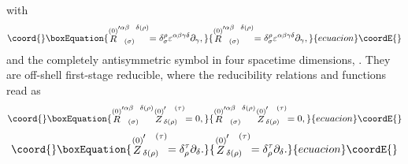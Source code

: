 \documentclass[a4paper,12pt]{article}
\begin{document}
with 
\begin{equation}\coord{}\boxEquation{
\stackrel{(0)}{R}_{\;\;\;(\sigma )}^{\prime \alpha \beta \;\;\;\delta (\rho
)}=\delta _{\sigma }^{\rho }\varepsilon ^{\alpha \beta \gamma \delta
}\partial _{\gamma },  \label{fcola4}
}{
\stackrel{(0)}{R}_{\;\;\;(\sigma )}^{\prime \alpha \beta \;\;\;\delta (\rho
)}=\delta _{\sigma }^{\rho }\varepsilon ^{\alpha \beta \gamma \delta
}\partial _{\gamma },  }{ecuacion}\coordE{}\end{equation}
and \myHighlight{$\varepsilon ^{\alpha \beta \gamma \delta }$}\coordHE{} the completely
antisymmetric symbol in four spacetime dimensions, \coordHE{}.
They are off-shell first-stage reducible, where the reducibility relations
and functions read as 
\begin{equation}\coord{}\boxEquation{
\stackrel{(0)}{R}_{\;\;\;(\sigma )}^{\prime \alpha \beta \;\;\;\delta (\rho
)}\stackrel{(0)}{Z}_{\delta (\rho )}^{\prime \;\;\;\;(\tau )}=0,
\label{fcola5}
}{
\stackrel{(0)}{R}_{\;\;\;(\sigma )}^{\prime \alpha \beta \;\;\;\delta (\rho
)}\stackrel{(0)}{Z}_{\delta (\rho )}^{\prime \;\;\;\;(\tau )}=0,
}{ecuacion}\coordE{}\end{equation}
\begin{equation}\coord{}\boxEquation{
\stackrel{(0)}{Z}_{\delta (\rho )}^{\prime \;\;\;\;(\tau )}=\delta _{\rho
}^{\tau }\partial _{\delta }.  \label{fcola6}
}{
\stackrel{(0)}{Z}_{\delta (\rho )}^{\prime \;\;\;\;(\tau )}=\delta _{\rho
}^{\tau }\partial _{\delta }.  }{ecuacion}\coordE{}\end{equation}
\end{document}
